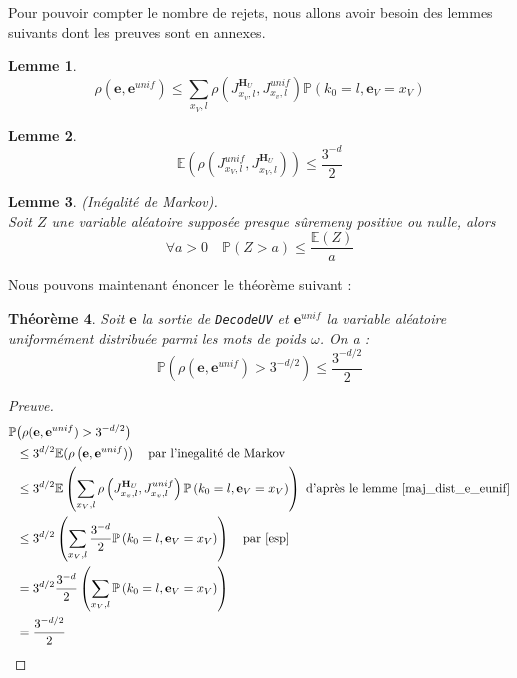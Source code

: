 \documentclass[12pt]{article}
\theoremstyle{plain}
\newtheorem{thm}{Théorème}[section]
\newtheorem{lemme}[thm]{Lemme}
\newcommand{\e}{\mathbf{e}}
\begin{document}
\noindent Pour pouvoir compter le nombre de rejets, nous allons avoir besoin des lemmes suivants dont les preuves sont en annexes.

\begin{lemme}\label{maj_dist_e_eunif}
$$ \rho\left(\e ,\e^{unif}\right) \leq \sum\limits_{x_V,l} \rho\left(J_{x_v,l}^{\mathbf{H}_U},J_{x_v,l}^{unif}\right)\mathbb{P}\left(k_0 = l, \e_V = x_V\right) $$ 
\end{lemme}


\begin{lemme}
\begin{equation}\label{esp}
\mathbb{E}\left(\rho\left(J_{x_V,l}^{unif},J_{x_V, l}^{\mathbf{H}_U}\right)\right) \leq \frac{3^{-d}}{2}
\end{equation}

\end{lemme}

\begin{lemme}\label{markov}(Inégalité de Markov).\\
Soit $Z$ une variable aléatoire supposée presque sûremeny positive ou nulle, alors $$\forall a>0\quad \mathbb{P}(Z > a) \leq \frac{\mathbb{E}(Z)}{a}$$
\end{lemme}

\noindent Nous pouvons maintenant énoncer le théorème suivant :

\begin{thm}\label{rejet}
Soit $\e$ la sortie de \verb|DecodeUV| et $\e^{unif}$ la variable aléatoire uniformément distribuée parmi les mots de poids $\omega$. On a :
$$ \mathbb{P}\left(\rho(\e,\e^{unif})>3^{-d/2}\right) \leq \frac{3^{-d/2}}{2} $$
\end{thm}

\begin{proof}[Preuve]
\begin{equation*}
\begin{split}
\mathbb{P}&\big(\rho(\e,\e^{unif})>3^{-d/2}\big) \\
&\leq 3^{d/2}\mathbb{E}(\rho\left(\e,\e^{unif})\right) \quad \text{par l'inegalité de Markov}\\
&\leq 3^{d/2}\mathbb{E}\left(\sum\limits_{x_V,l} \rho\left(J_{x_v,l}^{\mathbf{H}_U},J_{x_v,l}^{unif}\right)\mathbb{P}\left(k_0 = l , \e_V = x_V\right)\right) \text{ d'après le lemme \ref{maj_dist_e_eunif}}\\
&\leq 3^{d/2}\left(\sum\limits_{x_V,l} \frac{3^{-d}}{2}\mathbb{P}\left(k_0 = l ,\e_V = x_V\right)\right) \quad \text{par \eqref{esp}}\\
&= 3^{d/2} \frac{3^{-d}}{2}\left(\sum\limits_{x_V,l}\mathbb{P}\left(k_0 = l ,\e_V = x_V\right)\right) \\
&= \frac{3^{-d/2}}{2}\\
\end{split}
\end{equation*}
\end{proof}
\end{document}
